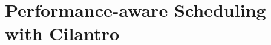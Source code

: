 \chapter{Performance-aware Scheduling with Cilantro}
\label{ch_cilantro}


\newcommand{\cilantropolicyheader}[1]{\underline{#1}}
















% 



